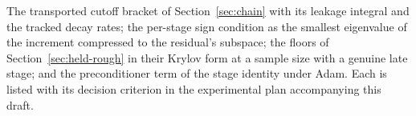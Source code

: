 \begin{remark}
The transported cutoff bracket of Section~\ref{sec:chain} with its leakage
integral and the tracked decay rates; the per-stage sign condition as the
smallest eigenvalue of the increment compressed to the residual's subspace;
the floors of Section~\ref{sec:held-rough} in their Krylov form at a sample
size with a genuine late stage; and the
preconditioner term of the stage identity under Adam. Each is listed with
its decision criterion in the experimental plan accompanying this draft.
\end{remark}
